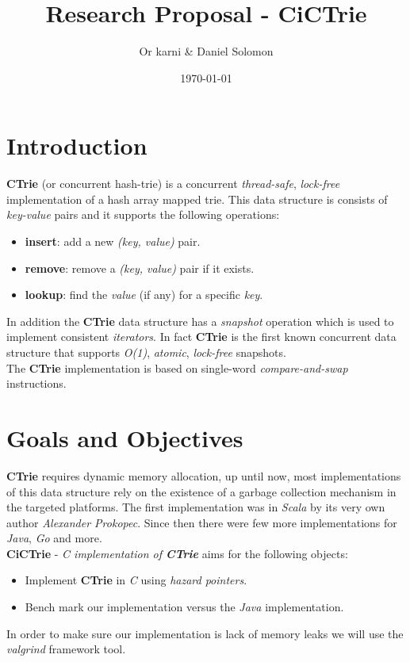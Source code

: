 \documentclass[dvips,12pt]{article}
\begin{document}
	
	\title{Research Proposal - CiCTrie}
	\author{Or karni \& Daniel Solomon}
	\date{\today}
		
	\maketitle
	
	\section{Introduction}
	
		\textbf{CTrie}\cite{article}\cite{wiki-ctrie} (or concurrent hash-trie) is a concurrent \textit{thread-safe}, \textit{lock-free} implementation of a hash array mapped trie. This data structure is consists of \textit{key-value} pairs and it supports the following operations:
		\begin{itemize}
			\item \textbf{insert}: add a new \textit{(key, value)} pair.
			\item \textbf{remove}: remove a \textit{(key, value)} pair if it exists.
			\item \textbf{lookup}: find the \textit{value} (if any) for a specific \textit{key}. 
		\end{itemize}
		In addition the \textbf{CTrie} data structure has a \textit{snapshot} operation which is used to implement consistent \textit{iterators}. In fact \textbf{CTrie} is the first known concurrent data structure that supports \textit{O(1)}, \textit{atomic}, \textit{lock-free} snapshots.\\
		The \textbf{CTrie} implementation is based on single-word \textit{compare-and-swap} instructions. 
 	
	\section{Goals and Objectives}
		\textbf{CTrie} requires dynamic memory allocation, up until now, most implementations of this data structure rely on the existence of a garbage collection mechanism in the targeted platforms. The first implementation was in \textit{Scala} by its very own author \textit{Alexander Prokopec}. Since then there were few more implementations for \textit{Java}, \textit{Go} and more. \\
		\textbf{CiCTrie} - \textit{C implementation of \textbf{CTrie}} aims for the following objects:
		\begin{itemize}
			\item Implement \textbf{CTrie} in \textit{C} using \textit{hazard pointers}\cite{hazard}.
			\item Bench mark our implementation versus the \textit{Java} implementation. 
		\end{itemize}
		In order to make sure our implementation is lack of memory leaks we will use the \textit{valgrind}\cite{valgrind} framework tool.
	
\end{document}
